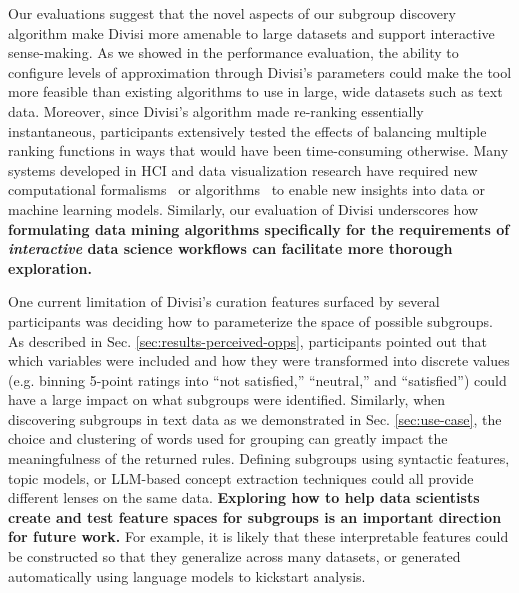 Our evaluations suggest that the novel aspects of our subgroup discovery algorithm make Divisi more amenable to large datasets and support interactive sense-making.
As we showed in the performance evaluation, the ability to configure levels of approximation through Divisi's parameters could make the tool more feasible than existing algorithms to use in large, wide datasets such as text data. 
Moreover, since Divisi's algorithm made re-ranking essentially instantaneous, participants extensively tested the effects of balancing multiple ranking functions in ways that would have been time-consuming otherwise.
Many systems developed in HCI and data visualization research have required new computational formalisms~\cite{suresh_kaleidoscope_2023,robertson_angler_2023} or algorithms~\cite{perer_frequence_2014,lam_concept_2024} to enable new insights into data or machine learning models.
Similarly, our evaluation of Divisi underscores how \textbf{formulating data mining algorithms specifically for the requirements of \textit{interactive} data science workflows can facilitate more thorough exploration.}

One current limitation of Divisi's curation features surfaced by several participants was deciding how to parameterize the space of possible subgroups.
As described in Sec. \ref{sec:results-perceived-opps}, participants pointed out that which variables were included and how they were transformed into discrete values (e.g. binning 5-point ratings into ``not satisfied,'' ``neutral,'' and ``satisfied'') could have a large impact on what subgroups were identified.
Similarly, when discovering subgroups in text data as we demonstrated in Sec. \ref{sec:use-case}, the choice and clustering of words used for grouping can greatly impact the meaningfulness of the returned rules.
Defining subgroups using syntactic features, topic models, or LLM-based concept extraction techniques could all provide different lenses on the same data.
\textbf{Exploring how to help data scientists create and test feature spaces for subgroups is an important direction for future work.}
For example, it is likely that these interpretable features could be constructed so that they generalize across many datasets, or generated automatically using language models to kickstart analysis. %

